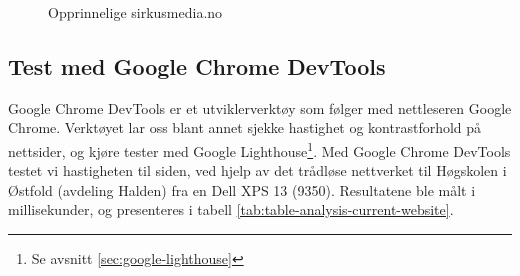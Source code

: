 \begin{figure}[H]
    \begin{center}
        \label{fig:analysis-current-sirkusmedia.no}
        \caption{Opprinnelige sirkusmedia.no}
    \end{center}
\end{figure}

\subsection{Test med Google Chrome DevTools}
\label{sec:google-chrome-devtools}
Google Chrome DevTools \cite{google2019cdt} er et utviklerverktøy som følger med nettleseren Google Chrome. Verktøyet lar oss blant annet sjekke hastighet og kontrastforhold på nettsider, og kjøre tester med Google Lighthouse\footnote{Se avsnitt \ref{sec:google-lighthouse}}. Med Google Chrome DevTools testet vi hastigheten til siden, ved hjelp av det trådløse nettverket til Høgskolen i Østfold (avdeling Halden) fra en Dell XPS 13 (9350). Resultatene ble målt i millisekunder, og presenteres i tabell \ref{tab:table-analysis-current-website}.


